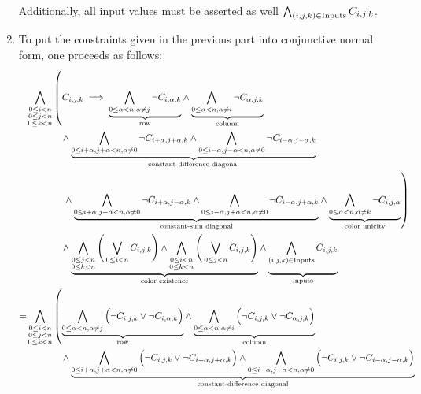 \documentclass[journal,onecolumn]{IEEEtran}
\begin{document}
\begin{enumerate}
	Additionally, all input values must be asserted as well	\(\bigwedge_{(i, j, k) \in \textnormal{Inputs}} C_{i, j, k}\).
	\item To put the constraints given in the previous part into conjunctive normal form, one proceeds as follows:
	\begin{align*}
	&\bigwedge_{\substack{0 \le i < n \\ 0 \le j < n \\ 0 \le k < n}} \left(C_{i, j, k} \implies {\underbrace{\bigwedge_{0 \le \alpha < n, \alpha \ne j} \lnot C_{i, \alpha, k}}_{\textnormal{row}}} \land {\underbrace{\bigwedge_{0 \le \alpha < n, \alpha \ne i} \lnot C_{\alpha, j, k}}_{\textnormal{column}}}\right. \\
	&\qquad \qquad \! \! {} \land {\underbrace{\bigwedge_{0 \le i+\alpha, j+\alpha < n, \alpha \ne 0} \lnot C_{i+\alpha, j+\alpha, k} \land \bigwedge_{0 \le i-\alpha, j-\alpha < n, \alpha \ne 0} \lnot C_{i-\alpha, j-\alpha, k}}_{\textnormal{constant-difference diagonal}}} \\
	&\left. \qquad \qquad \! \! {} \land {\underbrace{\bigwedge_{0 \le i+\alpha, j-\alpha < n, \alpha \ne 0} \lnot C_{i+\alpha, j-\alpha, k} \land \bigwedge_{0 \le i-\alpha, j+\alpha < n, \alpha \ne 0} \lnot C_{i-\alpha, j+\alpha, k}}_{\textnormal{constant-sum diagonal}}} \land {\underbrace{\bigwedge_{0 \le \alpha < n, \alpha \ne k} \lnot C_{i, j, \alpha}}_{\textnormal{color unicity}}} \right) \\
	&\qquad \qquad \! \! {}  \land {\underbrace{\bigwedge_{\substack{0 \le j < n \\ 0 \le k < n}} \Bigg(\bigvee_{0 \le i < n} C_{i, j, k}\Bigg) \land \bigwedge_{\substack{0 \le i < n \\ 0 \le k < n}} \Bigg(\bigvee_{0 \le j < n} C_{i, j, k}\Bigg)}_{\textnormal{color existence}}} \land {\underbrace{\bigwedge_{(i, j, k) \in \textnormal{Inputs}} C_{i, j, k} \vphantom{\bigwedge_{\substack{0 \le j < n \\ 0 \le k < n}}}}_{\textnormal{inputs}}} \\
	=&\bigwedge_{\substack{0 \le i < n \\ 0 \le j < n \\ 0 \le k < n}} \left({\underbrace{\bigwedge_{0 \le \alpha < n, \alpha \ne j} \Big(\lnot C_{i, j, k} \lor \lnot C_{i, \alpha, k} \Big)}_{\textnormal{row}}} \land {\underbrace{\bigwedge_{0 \le \alpha < n, \alpha \ne i} \Big(\lnot C_{i, j, k} \lor \lnot C_{\alpha, j, k}\Big)}_{\textnormal{column}}} \right.\\
	&\qquad \qquad \! \! {}  \land {\underbrace{\bigwedge_{0 \le i+\alpha, j+\alpha < n, \alpha \ne 0} \Big( \lnot C_{i, j, k} \lor \lnot C_{i + \alpha, j+\alpha, k}\Big) \land \bigwedge_{0 \le i-\alpha, j-\alpha < n, \alpha \ne 0} \Big( \lnot C_{i, j, k} \lor \lnot C_{i-\alpha, j-\alpha, k} \Big)}_{\textnormal{constant-difference diagonal}}}\\

\end{align*}
\end{enumerate}
\end{document}
